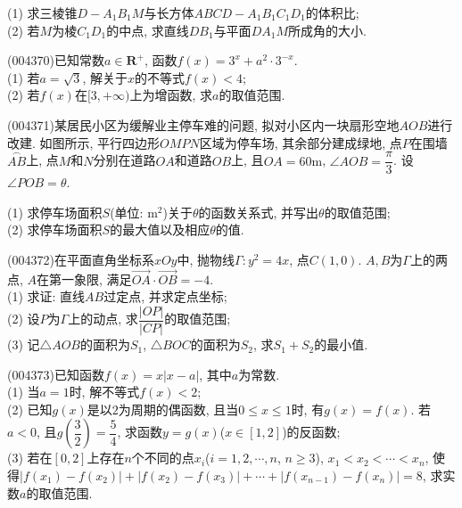 (1) 求三棱锥$D-A_1B_1M$与长方体$ABCD-A_1B_1C_1D_1$的体积比;\\
(2) 若$M$为棱$C_1D_1$的中点, 求直线$DB_1$与平面$DA_1M$所成角的大小.
\item (004370)已知常数$a\in \mathbf{R}^+$, 函数$f(x)=3^x+a^2\cdot 3^{-x}$.\\
(1) 若$a=\sqrt 3$, 解关于$x$的不等式$f(x)<4$;\\
(2) 若$f(x)$在$[3,+\infty)$上为增函数, 求$a$的取值范围.
\item (004371)某居民小区为缓解业主停车难的问题, 拟对小区内一块扇形空地$AOB$进行改建. 如图所示, 平行四边形$OMPN$区域为停车场, 其余部分建成绿地, 点$P$在围墙$\overset\frown{AB}$上, 点$M$和$N$分别在道路$OA$和道路$OB$上, 且$OA=60\text{m}$, $\angle AOB=\dfrac\pi 3$. 设$\angle POB=\theta$.
\begin{center}
\end{center}
(1) 求停车场面积$S$(单位: $\text{m}^2$)关于$\theta$的函数关系式, 并写出$\theta$的取值范围;\\
(2) 求停车场面积$S$的最大值以及相应$\theta$的值.
\item (004372)在平面直角坐标系$xOy$中, 抛物线$\Gamma:y^2=4x$, 点$C(1,0)$. $A,B$为$\Gamma$上的两点, $A$在第一象限, 满足$\overrightarrow{OA}\cdot \overrightarrow{OB}=-4$.\\
(1) 求证: 直线$AB$过定点, 并求定点坐标;\\
(2) 设$P$为$\Gamma$上的动点, 求$\dfrac{|OP|}{|CP|}$的取值范围;\\
(3) 记$\triangle AOB$的面积为$S_1$, $\triangle BOC$的面积为$S_2$, 求$S_1+S_2$的最小值.
\item (004373)已知函数$f(x)=x|x-a|$, 其中$a$为常数.\\
(1) 当$a=1$时, 解不等式$f(x)<2$;\\
(2) 已知$g(x)$是以$2$为周期的偶函数, 且当$0\le x\le 1$时, 有$g(x)=f(x)$. 若$a<0$, 且$g(\dfrac 32)=\dfrac 54$, 求函数$y=g(x)$($x\in [1,2]$)的反函数;\\
(3) 若在$[0,2]$上存在$n$个不同的点$x_i$($i=1,2,\cdots,n$, $n\ge 3$), $x_1<x_2<\cdots <x_n$, 使得$|f(x_1)-f(x_2)|+|f(x_2)-f(x_3)|+\cdots+|f(x_{n-1})-f(x_n)|=8$, 求实数$a$的取值范围.
